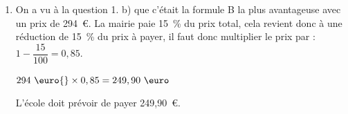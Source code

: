 \begin{enumerate}
	\medskip
	Pour la formule B, le prix est donné par l'expression $90+25,5x$. Sa représentation graphique est donc la droite d'ordonnée à l'origine 90.
	
	\medskip
	Pour la formule C, le prix est constant et toujours égal à 300~\euro{}, sa représentation graphique est donc la droite horizontale avec tous les points d'ordonnée 300.
	
	\medskip
	On lit sur le graphique que la droite qui représente la formule B est au-dessous de celle de la formule A à partir de la 5e entrée.\\
	Donc, la formule B est plus économique que la formule A à partir de 5 entrées.
	
	\item On a vu à la question 1. b) que c'était la formule B la plus avantageuse avec un prix de 294~\euro{}. La mairie paie 15~\% du prix total, cela revient donc à une réduction de 15~\% du prix à payer, il faut donc multiplier le prix par : $1 - \dfrac{15}{100} = 0,85$.
	
	$294~\text{\euro{}}\times0,85=249,90~\text{\euro}$
	
	\medskip
	L'école doit prévoir de payer 249,90~\euro.
\end{enumerate}